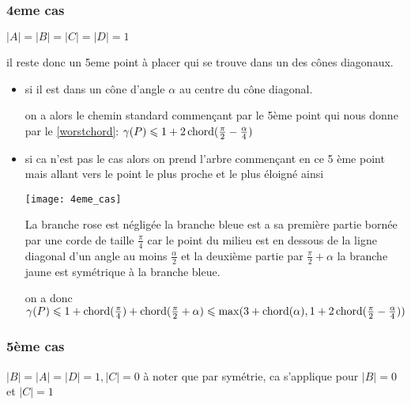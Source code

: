 \subsubsection*{4eme cas}\label{4cas} $|A| = |B| = |C| = |D| = 1$

il reste donc un 5eme point à placer qui se trouve dans un des cônes diagonaux.

\begin{itemize}

\item \label{4cas1} si il est dans un cône d'angle $\alpha$ au centre du cône diagonal.

on a alors le chemin standard commençant par le 5ème point qui nous donne par le \cref{worstchord}: $\gamma(P) \leqslant 1 + 2\operatorname{chord}(\frac{\pi}{2} - \frac{\alpha}{4})$

\item \label{4cas2} si ca n'est pas le cas alors on prend l'arbre commençant en ce 5 ème point mais allant vers le point le plus proche et le plus éloigné ainsi

  \texttt{[image: 4eme\_cas]}

La branche rose est négligée
la branche bleue est a sa première partie bornée par une corde de taille $\frac{\pi}{4}$ car le point du milieu est en dessous de la ligne diagonal d'un angle au moins $\frac{\alpha}{2}$ et la deuxième partie par $\frac{\pi}{2} + \alpha$
la branche jaune est symétrique à la branche bleue.

on a donc $\gamma(P) \leqslant 1 + \operatorname{chord}(\frac{\pi}{4}) + \operatorname{chord}(\frac{\pi}{2} + \alpha) \leqslant \max(3 + \operatorname{chord}(\alpha), 1 + 2\operatorname{chord}(\frac{\pi}{2} - \frac{\alpha}{4}))$

\end{itemize}

\subsubsection*{5ème cas}\label{5cas} $|B| = |A| = |D| = 1, |C| = 0$
à noter que par symétrie, ca s'applique pour $|B| = 0$ et $|C| = 1$


